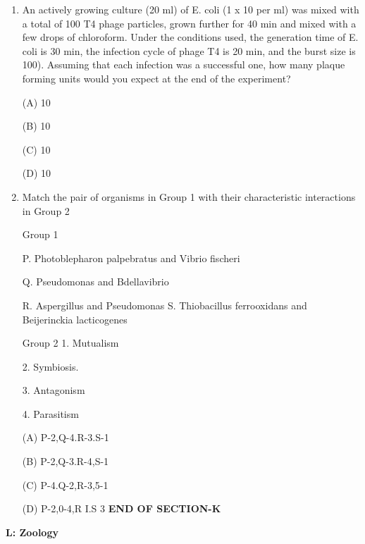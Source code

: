 \documentclass[journal]{IEEEtran}
\begin{document}
\begin{enumerate}
\begin{minipage}{0.5\textwidth}
\begin{flushright}
4. Clostridium
		\end{flushright}
		\end{minipage}


(A) P-4, Q-1.R-2,5-3

(B) P-4, Q-1,R-3,5-2

(C) P-2, Q-4.R-1.S-3

(D) P-1. Q-4.R-2,S-3

\item {An actively growing culture (20 ml) of E. coli (1 x 10 per ml) was mixed with a total of 100 T4 phage particles, grown further for 40 min and mixed with a few drops of chloroform. Under the conditions used, the generation time of E. coli is 30 min, the infection cycle of phage T4 is 20 min, and the burst size is 100). Assuming that each infection was a successful one, how many plaque forming units would you expect at the end of the experiment?

(A) 10

(B) 10

(C) 10

(D) 10
}
\item {Match the pair of organisms in Group 1 with their characteristic interactions in Group 2}
\begin{minipage}{0.5\textwidth}
	\begin{flushleft}

Group 1

P. Photoblepharon palpebratus and Vibrio fischeri

Q. Pseudomonas and Bdellavibrio

R. Aspergillus and Pseudomonas
S. Thiobacillus ferrooxidans and Beijerinckia lacticogenes

		\end{flushleft}
		\end{minipage}
	\begin{minipage}{0.5\textwidth}
		\begin{flushright}

Group 2
1. Mutualism

2. Symbiosis.


3. Antagonism


4. Parasitism
		\end{flushright}
		\end{minipage}


(A) P-2,Q-4.R-3.S-1

(B) P-2,Q-3.R-4,S-1

(C) P-4.Q-2,R-3,5-1

(D) P-2,0-4,R I.S 3
\newline
\textbf{END OF SECTION-K}

\end{enumerate}
\newpage
		\textbf{L: Zoology}
\end{document}
